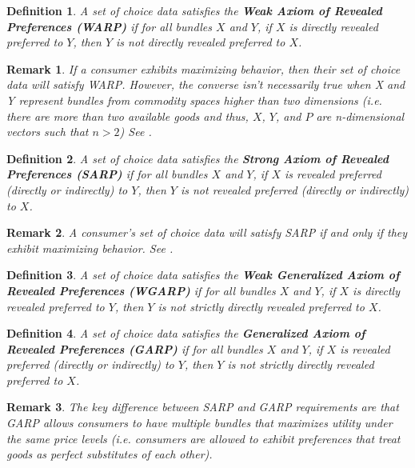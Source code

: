\documentclass{article} %
\newtheorem{definition}{Definition} %
\newtheorem{remark}{Remark}
\begin{document}
\begin{definition}
A set of choice data satisfies the \textbf{Weak Axiom of Revealed Preferences (WARP)} if for all bundles $X$ and $Y$, if $X$ is directly revealed preferred to $Y$, then $Y$ is not directly revealed preferred to $X$.
\end{definition}

\begin{remark}
If a consumer exhibits maximizing behavior, then their set of choice data will satisfy WARP. However, the converse isn't necessarily true when X and Y represent bundles from commodity spaces higher than two dimensions (i.e. there are more than two available goods and thus, $X$, $Y$, and $P$ are n-dimensional vectors such that $n> 2$)  See \citet{Rose1958Consistency-of-Preference:-The-Two-Commodity-Case}.
\end{remark}

\begin{definition}
A set of choice data satisfies the \textbf{Strong Axiom of Revealed Preferences (SARP)} if for all bundles $X$ and $Y$, if $X$ is revealed preferred (directly or indirectly) to $Y$, then $Y$ is not revealed preferred (directly or indirectly) to $X$.
\end{definition}

\begin{remark}
A consumer's set of choice data will satisfy SARP if and only if they exhibit maximizing behavior. See \citet{Samuelson1938A-Note-on-the-Pure-Theory-of-Consumer's-Behaviour}.
\end{remark}

\begin{definition}
A set of choice data satisfies the \textbf{Weak Generalized Axiom of Revealed Preferences (WGARP)} if for all bundles $X$ and $Y$, if $X$ is directly revealed preferred to $Y$, then $Y$ is not strictly directly revealed preferred to $X$.
\end{definition}

\begin{definition}
A set of choice data satisfies the \textbf{Generalized Axiom of Revealed Preferences (GARP)} if for all bundles $X$ and $Y$, if $X$ is revealed preferred (directly or indirectly) to $Y$, then $Y$ is not strictly directly revealed preferred to $X$.
\end{definition}

\begin{remark}
The key difference between SARP and GARP requirements are that GARP allows consumers to have multiple bundles that maximizes utility under the same price levels (i.e. consumers are allowed to exhibit preferences that treat goods as perfect substitutes of each other).
\end{remark}
\end{document}

